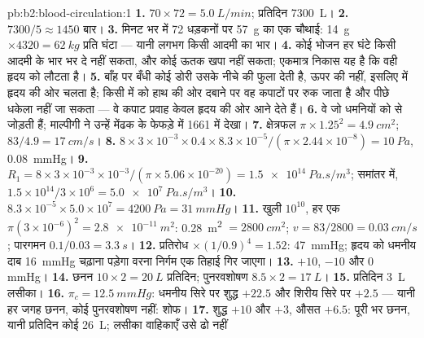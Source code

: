 \begin{solution}{pb:b2:blood-circulation:1}
\textbf{1.} $70\times 72 = \qty{5.0}{L/min}$; प्रतिदिन \qty{7300}{L}।
\textbf{2.} $7300/5 \approx 1450$ बार।
\textbf{3.} मिनट भर में 72 धड़कनों पर \qty{57}{g} का एक चौथाई: \qty{14}{g}
$\times 4320 = \qty{62}{kg}$ प्रति घंटा --- यानी लगभग किसी आदमी का भार।
\textbf{4.} कोई भोजन हर घंटे किसी आदमी के भार भर  दे नहीं सकता, और
कोई ऊतक खपा नहीं सकता; एकमात्र निकास यह है कि वही 
हृदय को लौटता है।
\textbf{5.} बाँह पर बँधी कोई डोरी उसके नीचे की  फुला देती है, ऊपर
की नहीं, इसलिए  में  हृदय की ओर चलता है;
किसी  में  को हाथ की ओर दबाने पर वह कपाटों पर रुक जाता है और
पीछे धकेला नहीं जा सकता --- वे कपाट प्रवाह केवल हृदय की ओर आने देते हैं।
\textbf{6.} वे  जो धमनियों को  से जोड़ती हैं; माल्पीगी ने
उन्हें मेंढक के फेफड़े में 1661 में देखा।
\textbf{7.} क्षेत्रफल $\pi\times 1.25^{2} = \qty{4.9}{cm^2}$; $83/4.9 =
\qty{17}{cm/s}$।
\textbf{8.} $8\times 3\times 10^{-3}\times 0.4\times 8.3\times
10^{-5}/(\pi\times 2.44\times 10^{-8}) = \qty{10}{Pa}$, \qty{0.08}{mmHg}।
\textbf{9.} $R_{1} = 8\times 3\times 10^{-3}\times 10^{-3}/(\pi\times
5.06\times 10^{-20}) = \qty{1.5e14}{Pa.s/m^3}$; समांतर में,
$1.5\times 10^{14}/3\times 10^{6} = \qty{5.0e7}{Pa.s/m^3}$।
\textbf{10.} $8.3\times 10^{-5}\times 5.0\times 10^{7} = \qty{4200}{Pa}
= \qty{31}{mmHg}$।
\textbf{11.} खुली  $10^{10}$, हर एक $\pi(3\times 10^{-6})^{2}
= \qty{2.8e-11}{m^2}$: \qty{0.28}{m^2} $= \qty{2800}{cm^2}$; $v =
83/2800 = \qty{0.03}{cm/s}$; पारगमन $0.1/0.03 = \qty{3.3}{s}$।
\textbf{12.} प्रतिरोध $\times(1/0.9)^{4} = 1.52$: \qty{47}{mmHg};
हृदय को धमनीय दाब \qty{16}{mmHg} चढ़ाना पड़ेगा वरना
निर्गम एक तिहाई गिर जाएगा।
\textbf{13.} $+10$, $-10$ और $0$ mmHg।
\textbf{14.} छनन $10\times 2 = \qty{20}{L}$ प्रतिदिन; पुनरवशोषण
$8.5\times 2 = \qty{17}{L}$।
\textbf{15.} प्रतिदिन \qty{3}{L} लसीका।
\textbf{16.} $\pi_c = \qty{12.5}{mmHg}$: धमनीय सिरे पर शुद्ध $+22.5$
और शिरीय सिरे पर $+2.5$ --- यानी हर जगह छनन, कोई
पुनरवशोषण नहीं: शोफ।
\textbf{17.} शुद्ध $+10$ और $+3$, औसत $+6.5$: पूरी  भर
छनन, यानी प्रतिदिन कोई \qty{26}{L}; लसीका वाहिकाएँ उसे ढो नहीं

\end{solution}
